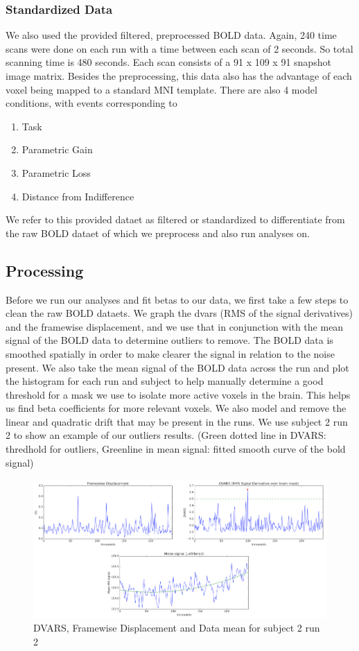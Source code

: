 \documentclass[11pt]{article}
\begin{document}
\subsubsection{Standardized Data}
We also used the provided filtered, preprocessed BOLD data. Again, 240 time 
scans were done on each run with a time between each scan of 2 seconds. So 
total scanning time is 480 seconds. Each scan consists of a 91 x 109 x 91 
snapshot image matrix. Besides the preprocessing, this data also has the 
advantage of each voxel being mapped to a standard MNI template. There are 
also 4 model conditions, with events corresponding to 
\begin{enumerate}
  \item Task
  \item Parametric Gain
  \item Parametric Loss
  \item Distance from Indifference
\end{enumerate}
We refer to this provided dataet as filtered or standardized to differentiate 
from the raw
BOLD dataet of which we preprocess and also run analyses on.

\subsection{Processing}
Before we run our analyses and fit betas to our data, we first take a few 
steps to clean the raw BOLD dataets. We graph the dvars (RMS of the signal 
derivatives) and the framewise displacement, and we use that in conjunction 
with the mean signal of the BOLD data to determine outliers to remove. The 
BOLD data is smoothed spatially in order to make clearer the signal in 
relation to the noise present. We also take the mean signal of the BOLD data 
across the run and plot the histogram for each run and subject to help 
manually determine a good threshold for a mask we use to isolate more active 
voxels in the brain. This helps us find beta coefficients for more relevant 
voxels. We also model and remove the linear and quadratic drift that may be 
present in the runs. We use subject 2 run 2 to show an example of our outliers
results. (Green dotted line in DVARS: thredhold for outliers, Greenline in mean 
signal: fitted smooth curve of the bold signal)

\begin{figure}[H]
    \centering
        \includegraphics[scale=0.55]{figures/processing.png}
    \caption{DVARS, Framewise Displacement and Data mean for subject 2 run 2}
\end{figure}
\end{document}
